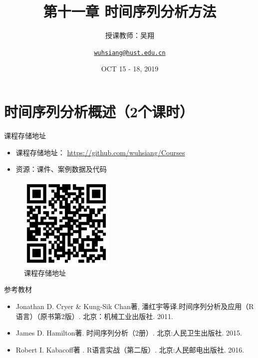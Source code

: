 \documentclass[
  ignorenonframetext,
]{beamer}
\title{第十一章 时间序列分析方法}
\author{授课教师：吴翔 \newline \and \href{mailto:wuhsiang@hust.edu.cn}{\nolinkurl{wuhsiang@hust.edu.cn}}}
\date{OCT 15 - 18, 2019}
\providecommand{\tightlist}{%
  \setlength{\itemsep}{0pt}\setlength{\parskip}{0pt}}
\begin{document}
\frame{\titlepage}

\begin{frame}
  \tableofcontents[hideallsubsections]
\end{frame}
\hypertarget{ux65f6ux95f4ux5e8fux5217ux5206ux6790ux6982ux8ff02ux4e2aux8bfeux65f6}{%
\section{时间序列分析概述（2个课时）}\label{ux65f6ux95f4ux5e8fux5217ux5206ux6790ux6982ux8ff02ux4e2aux8bfeux65f6}}

\begin{frame}{课程存储地址}
\protect\hypertarget{ux8bfeux7a0bux5b58ux50a8ux5730ux5740}{}

\begin{itemize}
\tightlist
\item
  课程存储地址： \url{https://github.com/wuhsiang/Courses}
\item
  资源：课件、案例数据及代码
\end{itemize}

\begin{figure}
\centering
\includegraphics[width=0.4\textwidth,height=\textheight]{../../QR.png}
\caption{课程存储地址}
\end{figure}

\end{frame}

\begin{frame}{参考教材}
\protect\hypertarget{ux53c2ux8003ux6559ux6750}{}

\begin{itemize}
\tightlist
\item
  Jonathan D. Cryer \& Kung-Sik Chan著,
  潘红宇等译.时间序列分析及应用（R语言）（原书第2版）.
  北京：机械工业出版社. 2011.
\item
  James D. Hamilton著. 时间序列分析（2册）. 北京:人民卫生出版社. 2015.
\item
  Robert I. Kabacoff著 . R语言实战（第二版）. 北京:人民邮电出版社. 2016.
\end{itemize}

\end{frame}
\end{document}
